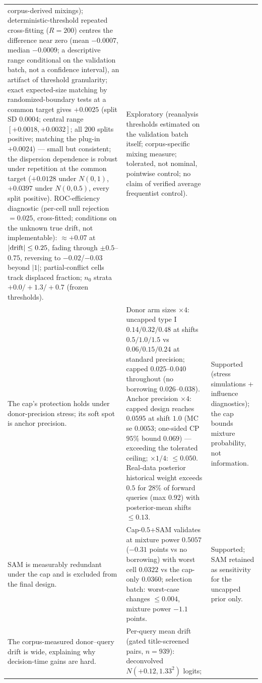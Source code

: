 \documentclass[11pt]{article}
\begin{document}
\begin{longtable}{p{} p{} p{}}
corpus-derived mixings); deterministic-threshold repeated cross-fitting
($R=200$) centres the
difference near zero (mean $-0.0007$, median $-0.0009$; a descriptive
range conditional on the validation batch, not a confidence interval),
an artifact of threshold granularity; exact expected-size matching by
randomized-boundary tests at a common target gives $+0.0025$ (split SD
$0.0004$; central range $[+0.0018,+0.0032]$; all $200$ splits positive;
matching the plug-in $+0.0024$) --- small but consistent; the
dispersion
dependence is robust under repetition at the common target ($+0.0128$
under $N(0,1)$, $+0.0397$ under $N(0,0.5)$, every split positive). ROC-efficiency
diagnostic (per-cell null rejection $=0.025$, cross-fitted; conditions on
the unknown true drift, not implementable): $\approx +0.07$ at
$|{\rm drift}| \le 0.25$, fading through $\pm 0.5$--$0.75$, reversing to
$-0.02$/$-0.03$ beyond $|1|$; partial-conflict cells track displaced
fraction; $n_0$ strata $+0.0/+1.3/+0.7$ (frozen thresholds). &
Exploratory
(reanalysis thresholds estimated on the validation batch itself;
corpus-specific mixing measure; tolerated, not nominal, pointwise
control; no claim of verified average frequentist control). \\
The cap's protection holds under donor-precision stress; its soft spot is
anchor precision. & Donor arm sizes $\times 4$: uncapped type I
$0.14/0.32/0.48$ at shifts $0.5/1.0/1.5$ vs $0.06/0.15/0.24$ at standard
precision; capped $0.025$--$0.040$ throughout (no borrowing
$0.026$--$0.038$). Anchor precision $\times 4$: capped design reaches
$0.0595$ at shift $1.0$ (MC se $0.0053$; one-sided CP $95\%$ bound
$0.069$) --- exceeding the tolerated ceiling; $\times 1/4$: $\le 0.050$.
Real-data posterior
historical weight exceeds $0.5$ for $28\%$ of forward queries (max
$0.92$) with posterior-mean shifts $\le 0.13$. & Supported (stress
simulations + influence diagnostics); the cap bounds mixture probability,
not information. \\
SAM is measurably redundant under the cap and is excluded from the final
design. & Cap-$0.5$+SAM validates at mixture power $0.5057$ ($-0.31$
points vs no borrowing) with worst cell $0.0322$ vs the cap-only
$0.0360$; selection batch: worst-case changes $\le 0.004$, mixture power
$-1.1$ points. & Supported; SAM retained as sensitivity for the uncapped
prior only. \\
The corpus-measured donor--query drift is wide, explaining why
decision-time gains are hard. & Per-query mean drift (gated
title-screened pairs, $n=939$): deconvolved $N(+0.12, 1.33^2)$ logits;

\end{longtable}
\end{document}
